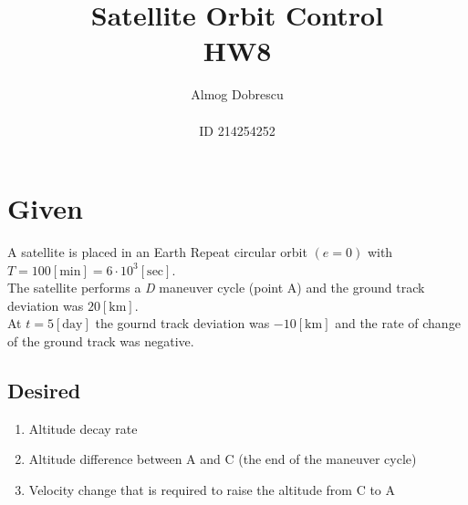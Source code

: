 \documentclass[11pt, a4paper]{article}
\title{Satellite Orbit Control \\ HW8}
\author{Almog Dobrescu\\\\ID 214254252}
\begin{document}
\maketitle

\thispagestyle{empty}
\newpage
\setcounter{page}{1}

\tableofcontents
\vfil
\newpage

\section{Given}
A satellite is placed in an Earth Repeat circular orbit $\left(e=0\right)$ with $T=100\left[\mathrm{min}\right]=6\cdot10^3\left[\mathrm{sec}\right]$. \\The satellite performs a \emph{D} maneuver cycle (point A) and the ground track deviation was $20\left[\mathrm{km}\right]$.\\
At $t=5\left[\mathrm{day}\right]$ the gournd track deviation was $-10\left[\mathrm{km}\right]$ and the rate of change of the ground track was negative.
\subsection{Desired}
\begin{enumerate}
    \item Altitude decay rate
    \item Altitude difference between A and C (the end of the maneuver cycle)
    \item Velocity change that is required to raise the altitude from C to A
\end{enumerate}

\end{document}
